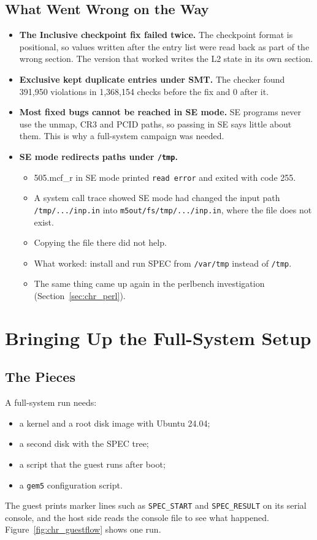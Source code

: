 \subsection{What Went Wrong on the Way}
\begin{itemize}
    \item \textbf{The Inclusive checkpoint fix failed twice.} The checkpoint format is positional, so values written after the entry list were read back as part of the wrong section. The version that worked writes the L2 state in its own section.
    \item \textbf{Exclusive kept duplicate entries under SMT.} The checker found 391,950 violations in 1,368,154 checks before the fix and 0 after it.
    \item \textbf{Most fixed bugs cannot be reached in SE mode.} SE programs never use the unmap, CR3 and PCID paths, so passing in SE says little about them. This is why a full-system campaign was needed.
    \item \textbf{SE mode redirects paths under \texttt{/tmp}.}
    \begin{itemize}
        \item 505.mcf\_r in SE mode printed \texttt{read error} and exited with code 255.
        \item A system call trace showed SE mode had changed the input path \texttt{/tmp/.../inp.in} into \texttt{m5out/fs/tmp/.../inp.in}, where the file does not exist.
        \item Copying the file there did not help.
        \item What worked: install and run SPEC from \texttt{/var/tmp} instead of \texttt{/tmp}.
        \item The same thing came up again in the perlbench investigation (Section~\ref{sec:chr_perl}).
    \end{itemize}
\end{itemize}

\section{Bringing Up the Full-System Setup}
\label{sec:chr_bringup}

\subsection{The Pieces}
A full-system run needs:
\begin{itemize}
    \item a kernel and a root disk image with Ubuntu 24.04;
    \item a second disk with the SPEC tree;
    \item a script that the guest runs after boot;
    \item a \texttt{gem5} configuration script.
\end{itemize}
The guest prints marker lines such as \texttt{SPEC\_START} and \texttt{SPEC\_RESULT} on its serial console, and the host side reads the console file to see what happened. Figure~\ref{fig:chr_guestflow} shows one run.

